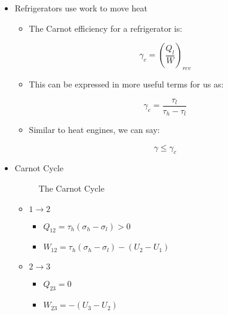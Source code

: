 \begin{itemize}
\begin{itemize}
    \end{itemize}

  \item Refrigerators use work to move heat

    \begin{itemize}

      \item The Carnot efficiency for a refrigerator is:

        $$\gamma_c=\left( \frac{Q_l}{W} \right)_{rev}$$

      \item This can be expressed in more useful terms for us as:

        $$\gamma_c=\frac{\tau_l}{\tau_h-\tau_l}$$

      \item Similar to heat engines, we can say:

        $$\gamma\leq\gamma_c$$

    \end{itemize}

  \item Carnot Cycle

    \begin{figure}[H]
      \centering
      
      \caption{The Carnot Cycle}
      \label{fig:1}
    \end{figure}

    \begin{itemize}

      \item $1\to2$

        \begin{itemize}

          \item $Q_{12}=\tau_h(\sigma_h-\sigma_l)>0$

          \item $W_{12}=\tau_h(\sigma_h-\sigma_l)-(U_2-U_1)$

        \end{itemize}

      \item $2\to3$

        \begin{itemize}

          \item $Q_{23}=0$

          \item $W_{23}=-(U_3-U_2)$

        \end{itemize}


\end{itemize}
\end{itemize}
